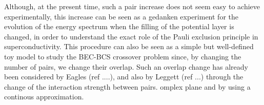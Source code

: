 \documentclass[aps,prb,superscriptaddress,twocolumn]{revtex4}
\begin{document}
Although, at the present time, such a pair increase
does not seem easy to achieve experimentally, this increase can be seen as a gedanken experiment
for the evolution of the energy spectrum when
the filling of the potential layer is changed, in order to understand the exact role of the Pauli
exclusion principle in superconductivity. 
This procedure can also be
seen as a simple but well-defined toy model to study the BEC-BCS crossover
problem
since, by changing the number of pairs, we change their overlap. Such an overlap change has already been considered by Eagles (ref ....), and also by Leggett (ref ...) through the change of the interaction strength between pairs.
 omplex plane and by using a continous approximation.
\end{document}
